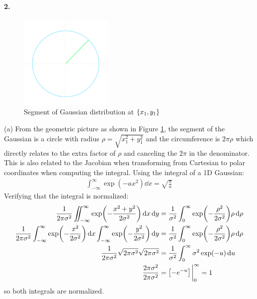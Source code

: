 \documentclass[../main.tex]{subfiles}
\begin{document}
\paragraph*{2.}
\begin{figure}[ht]
    \centering
    \includegraphics[width=0.4\textwidth]{hw2_2a.png}
    \caption{Segment of Gaussian distribution at $\qt{x_1 , y_1}$}
    \label{fig:hw2_2}
\end{figure}
(a) From the geometric picture as shown in Figure \ref{fig:hw2_2}, the segment of the Gaussian 
is a circle with radius $\rho = \sqrt{x_1^2 + y_1^2}$ and the circumference is $2\pi \rho$ which
directly relates to the extra factor of $\rho$ and canceling the $2\pi$ in the denominator. This 
is also related to the Jacobian when transforming from Cartesian to polar coordinates when computing 
the integral. Using the integral of a 1D Gaussian:
\begin{align*}
    \int_{-\infty}^\infty \exp(-ax^2) \dd{x} = \sqrt{\frac{\pi}{a}}
\end{align*}
Verifying that the integral is normalized:
\begin{align*}
    \frac{1}{2\pi\sigma^2} \iint_{-\infty}^\infty \exp(-\frac{x^2 + y^2}{2\sigma^2}) \dd{x} \dd{y}
    &= \frac{1}{\sigma^2} \int_0^\infty \exp(-\frac{\rho^2}{2\sigma^2}) \rho \dd{\rho} \\
    \frac{1}{2\pi\sigma^2} \int_{-\infty}^\infty \exp(-\frac{x^2}{2\sigma^2}) \dd{x} 
        \int_{-\infty}^\infty \exp(-\frac{y^2}{2\sigma^2}) \dd{y}
    &= \frac{1}{\sigma^2}
        \int_0^\infty \exp(-\frac{\rho^2}{2\sigma^2}) \rho \dd{\rho} \\
    \frac{1}{2\pi\sigma^2} \sqrt{2\pi\sigma^2} \sqrt{2\pi\sigma^2}
    &= \frac{1}{\sigma^2} \int_0^\infty \sigma^2 \exp(-u) \dd{u} \\
    \frac{2\pi\sigma^2}{2\pi\sigma^2} &= \qt[-e^{-u}]\eval_0^\infty = 1
\end{align*}
so both integrals are normalized.
\end{document}
